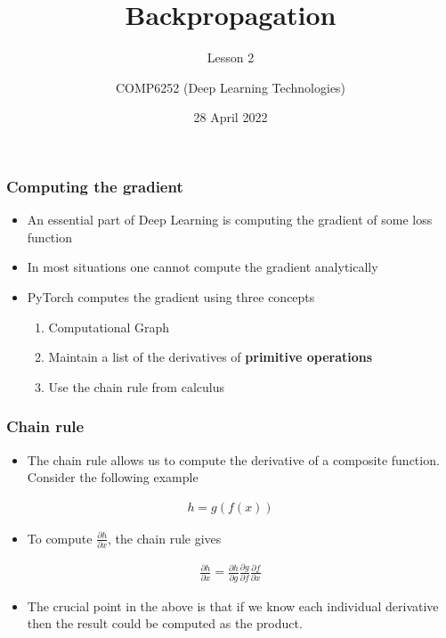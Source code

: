 \documentclass{beamer}
\title{Backpropagation}
\subtitle{Lesson 2}
\author{COMP6252 (Deep Learning Technologies)}
\institute[ECS, University of Southampton]{ECS, University of Southampton} \date{28 April 2022}
\theoremstyle{plain} %
\theoremstyle{example} %
\newcommand{\deriv}[2]{\ensuremath{\frac{\partial #1}{\partial #2}}}
\begin{document}
\begin{frame}
\placelogofalse %
\titlepage
\end{frame}

\placelogotrue %
\begin{frame}
    \frametitle{Computing the gradient}
\begin{itemize}
    \item An essential part of Deep Learning is computing the gradient of some loss function
    \item In most situations one cannot compute the gradient analytically
    \item PyTorch computes the gradient using three concepts
    \begin{enumerate}
        \item Computational Graph
        \item Maintain a list of the derivatives of \textbf{primitive operations}
        \item Use the chain rule from calculus
    \end{enumerate}
\end{itemize}
    

\end{frame}


\begin{frame}
    \frametitle{Chain rule}
\begin{itemize}
    \item The chain rule allows us to compute the derivative of a composite function. Consider the following example
\end{itemize}
\begin{align*}
    h=g(f(x))
\end{align*}
\begin{itemize}
    \item To  compute $\deriv{h}{x}$, the chain rule gives
\end{itemize}    
\begin{align*}
    \deriv{h}{x}=\deriv{h}{g}\deriv{g}{f}\deriv{f}{x}
\end{align*}
\begin{itemize}
    \item The crucial point in the above is that if we know each individual derivative then the result could be computed as the product.
\end{itemize}
\end{frame}
\end{document}
